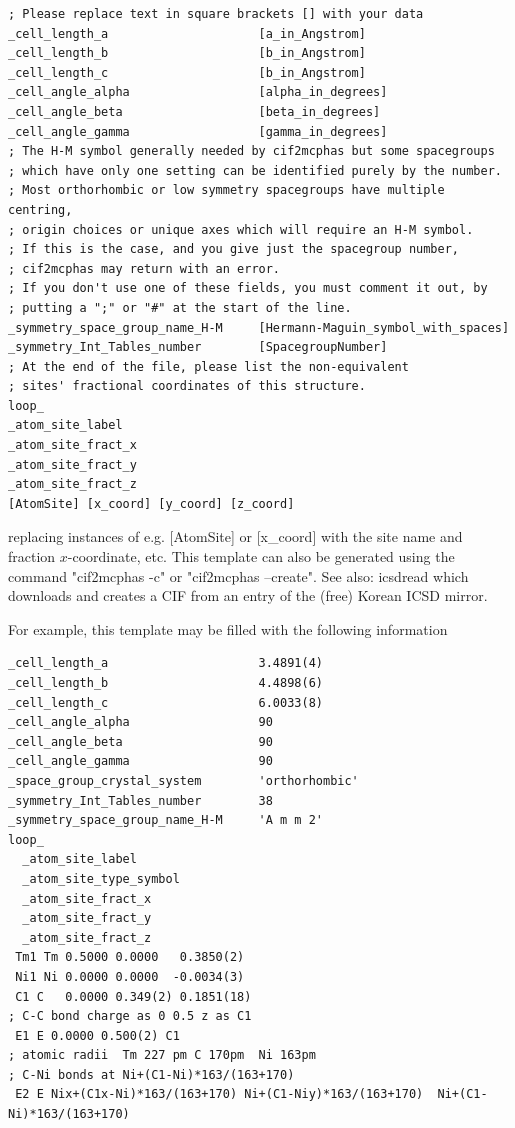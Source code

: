 \begin{description}
\begin{verbatim}
; Please replace text in square brackets [] with your data
_cell_length_a                     [a_in_Angstrom]
_cell_length_b                     [b_in_Angstrom]
_cell_length_c                     [b_in_Angstrom]
_cell_angle_alpha                  [alpha_in_degrees]
_cell_angle_beta                   [beta_in_degrees]
_cell_angle_gamma                  [gamma_in_degrees]
; The H-M symbol generally needed by cif2mcphas but some spacegroups
; which have only one setting can be identified purely by the number.
; Most orthorhombic or low symmetry spacegroups have multiple centring,
; origin choices or unique axes which will require an H-M symbol.
; If this is the case, and you give just the spacegroup number,
; cif2mcphas may return with an error.
; If you don't use one of these fields, you must comment it out, by
; putting a ";" or "#" at the start of the line.
_symmetry_space_group_name_H-M     [Hermann-Maguin_symbol_with_spaces]
_symmetry_Int_Tables_number        [SpacegroupNumber]
; At the end of the file, please list the non-equivalent
; sites' fractional coordinates of this structure.
loop_
_atom_site_label
_atom_site_fract_x
_atom_site_fract_y
_atom_site_fract_z
[AtomSite] [x_coord] [y_coord] [z_coord]
\end{verbatim}

replacing instances of e.g. [AtomSite] or [x\_coord] with the site name and fraction $x$-coordinate, etc.
This template can also be generated using the command "{\prg cif2mcphas -c}" or "{\prg cif2mcphas --create}".
See also: {\prg icsdread} which downloads and creates a CIF from an entry of the (free) Korean ICSD mirror.

For example, this template may be filled with the following information
\begin{verbatim}
_cell_length_a                     3.4891(4)
_cell_length_b                     4.4898(6)
_cell_length_c                     6.0033(8)
_cell_angle_alpha                  90
_cell_angle_beta                   90
_cell_angle_gamma                  90
_space_group_crystal_system        'orthorhombic'
_symmetry_Int_Tables_number        38
_symmetry_space_group_name_H-M     'A m m 2'
loop_
  _atom_site_label
  _atom_site_type_symbol
  _atom_site_fract_x
  _atom_site_fract_y
  _atom_site_fract_z
 Tm1 Tm 0.5000 0.0000   0.3850(2)     
 Ni1 Ni 0.0000 0.0000  -0.0034(3)      
 C1 C   0.0000 0.349(2) 0.1851(18)     
; C-C bond charge as 0 0.5 z as C1
 E1 E 0.0000 0.500(2) C1
; atomic radii  Tm 227 pm C 170pm  Ni 163pm
; C-Ni bonds at Ni+(C1-Ni)*163/(163+170)
 E2 E Nix+(C1x-Ni)*163/(163+170) Ni+(C1-Niy)*163/(163+170)  Ni+(C1-Ni)*163/(163+170) 
\end{verbatim}


\end{description}
